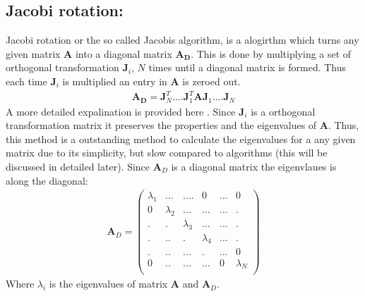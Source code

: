 \documentclass[a4paper, 10pt]{article}
\begin{document}
\subsection{Jacobi rotation:} Jacobi rotation or the so called Jacobis algorithm,
is a alogirthm which turns any given matrix $\mathbf{A}$ into a diagonal matrix $\mathbf{A_{D}}$.
This is done by multiplying a set of orthogonal transformation $\mathbf{J}_{i}$, $N$ times until
a diagonal matrix is formed. Thus each time $\mathbf{J}_{i}$ is multiplied an entry in
$\mathbf{A}$ is zeroed out.
\begin{align}
  \mathbf{A_{D}} = \mathbf{J}^{T}_{N}....\mathbf{J}^{T}_{1}\mathbf{A}
  \mathbf{J}_{1}....\mathbf{J}_{N}
\end{align}
A more detailed expalination is provided here \cite{morten2}.
Since $\mathbf{J}_{i}$ is a orthogonal transformation matrix it preserves the properties and
the eigenvalues of $\mathbf{A}$. Thus, this method is a outstanding method
to calculate the eigenvalues for a any given matrix due to its simplicity, but slow
compared to algorithms (this will be discussed in detailed later). Since $\mathbf{A}_{D}$
is a diagonal matrix the eigenvlaues is along the diagonal:
\begin{align}
\mathbf{A}_{D} =
\begin{pmatrix}
\lambda_{1} & ... & .... & 0 & ... & 0\\
0 & \lambda_{2} & ... & ... &... &. \\
. & . &\lambda_{3} & ... & ... & . \\
. & .. & . & \lambda_{4} & ... & . \\
. & ..  & ... & . &... & 0 \\
0 & .. & ... & ... & 0 & \lambda_{N} \\
\end{pmatrix}
\end{align}
Where $\lambda_{i}$ is the eigenvalues of matrix $\mathbf{A}$ and $\mathbf{A}_{D}$.
\end{document}
